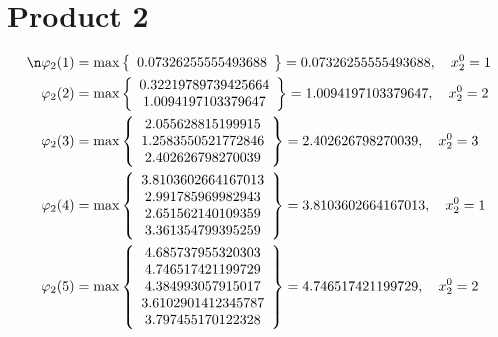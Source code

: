 \documentclass{article}
\begin{document}
\section{Product 2}
\begin{align*}
\n  
  
\varphi_{2}(1) &= \max \left\{ \begin{array}{c}
0.07326255555493688
\end{array} \right\} = 0.07326255555493688, \quad x_{2}^0 = 1\\
  
  
  
  
\varphi_{2}(2) &= \max \left\{ \begin{array}{c}
0.32219789739425664 \\
 1.0094197103379647
\end{array} \right\} = 1.0094197103379647, \quad x_{2}^0 = 2\\
  
  
  
  
\varphi_{2}(3) &= \max \left\{ \begin{array}{c}
2.055628815199915 \\
 1.2583550521772846 \\
 2.402626798270039
\end{array} \right\} = 2.402626798270039, \quad x_{2}^0 = 3\\
  
  
  
  
\varphi_{2}(4) &= \max \left\{ \begin{array}{c}
3.8103602664167013 \\
 2.991785969982943 \\
 2.651562140109359 \\
 3.361354799395259
\end{array} \right\} = 3.8103602664167013, \quad x_{2}^0 = 1\\
  
  
  
  
\varphi_{2}(5) &= \max \left\{ \begin{array}{c}
4.685737955320303 \\
 4.746517421199729 \\
 4.384993057915017 \\
 3.6102901412345787 \\
 3.797455170122328
\end{array} \right\} = 4.746517421199729, \quad x_{2}^0 = 2\\
  
  
  

\end{align*}
\end{document}
